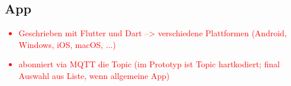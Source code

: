 \subsection{App}\label{ch:Umsetzung_App}
% 
\textcolor{red}{
	\begin{itemize}
		\item Geschrieben mit Flutter und Dart
		      --> verschiedene Plattformen (Android, Windows, iOS, macOS, ...)
		\item abonniert via MQTT die Topic (im Prototyp ist Topic hartkodiert; final Auswahl aus Liste, wenn allgemeine App)
	\end{itemize}
}
